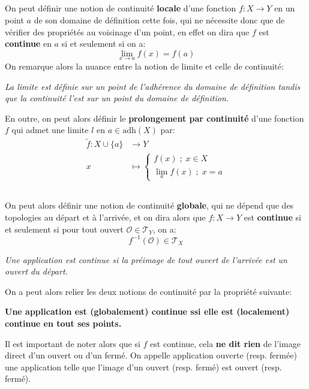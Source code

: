 \subsection*{}
On peut définir une notion de continuité \textbf{locale} d'une fonction \(f: X \longrightarrow Y\) en un point \(a\) de son domaine de définition cette fois, qui ne nécessite donc que de vérifier des propriétés au voisinage d'un point, en effet on dira que \(f\) est \textbf{continue} en \(a\) si et seulement si on a:
\[
   \lim_{x \rightarrow a} f(x) = f(a)
\] 
On remarque alors la nuance entre la notion de limite et celle de continuité:
\begin{center}
   \textit{La limite est définie sur un point de l'adhérence du domaine de définition tandis que la continuité l'est sur un point du domaine de définition.}
\end{center}
En outre, on peut alors définir le \textbf{prolongement par continuité} d'une fonction \(f\) qui admet une limite \(l\) en \(a \in \text{adh}(X)\) par:
\[
   \begin{aligned}
      \widetilde{f}: X \cup \{a\} &\longrightarrow Y \\
      x &\longmapsto \begin{cases}
         f(x) \; ; \; x \in X\\
         \lim_{a} f(x) \; ; \; x = a
      \end{cases} 
   \end{aligned}
\]
\subsection*{}
On peut alors définir une notion de continuité \textbf{globale}, qui ne dépend que des topologies au départ et à l'arrivée, et on dira alors que \(f: X \longrightarrow Y\) est \textbf{continue} si et seulement si pour tout ouvert \(\mathcal{O} \in \mathcal{T}_Y\), on a:
\[
   f^{-1}(\mathcal{O}) \in \mathcal{T}_X  
\]
\begin{center}
   \textit{Une application est continue si la préimage de tout ouvert de l'arrivée est un ouvert du départ.}
\end{center}
On a peut alors relier les deux notions de continuité par la propriété suivante:
\begin{center}
   \textbf{Une application est (globalement) continue ssi elle est (localement) continue en tout ses points.}
\end{center}
Il est important de noter alors que si \(f\) est continue, cela \textbf{ne dit rien} de l'image direct d'un ouvert ou d'un fermé. On appelle application ouverte (resp. fermée) une application telle que l'image d'un ouvert (resp. fermé) est ouvert (resp. fermé).
